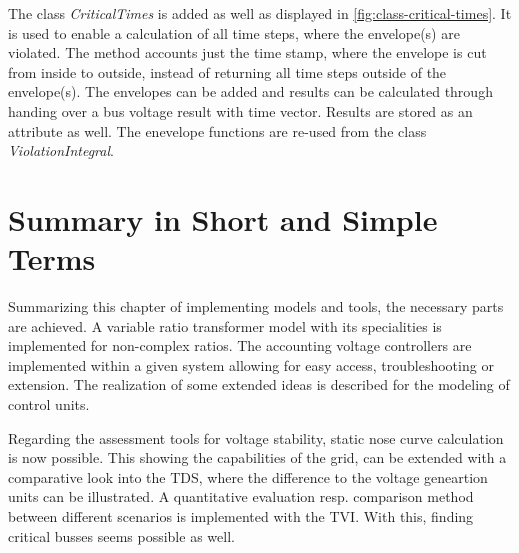 The class \textit{CriticalTimes} is added as well as displayed in \autoref{fig:class-critical-times}.
It is used to enable a calculation of all time steps, where the envelope(s) are violated.
The method accounts just the time stamp, where the envelope is cut from inside to outside, instead of returning all time steps outside of the envelope(s).
The envelopes can be added and results can be calculated through handing over a bus voltage result with time vector.
Results are stored as an attribute as well.
The enevelope functions are re-used from the class \textit{ViolationIntegral}.

\section{Summary in Short and Simple Terms}

Summarizing this chapter of implementing models and tools, the necessary parts are achieved.
A variable ratio transformer model with its specialities is implemented for non-complex ratios.
The accounting voltage controllers are implemented within a given system allowing for easy access, troubleshooting or extension.
The realization of some extended ideas is described for the modeling of control units.

Regarding the assessment tools for voltage stability, static nose curve calculation is now possible.
This showing the capabilities of the grid, can be extended with a comparative look into the \acs{TDS}, where the difference to the voltage geneartion units can be illustrated.
A quantitative evaluation resp. comparison method between different scenarios is implemented with the \acf{TVI}.
With this, finding critical busses seems possible as well.